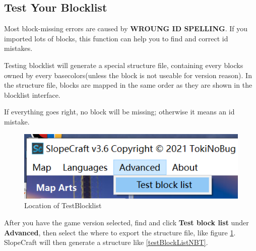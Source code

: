\documentclass{article}
\begin{document}
    \subsection{Test Your Blocklist}
    Most block-missing errors are caused by \textbf{WROUNG ID SPELLING}. If you imported lots of blocks, this function can help you to find and correct id mistakes.

    Testing blocklist will generate a special structure file, containing every blocks owned by every basecolors(unless the block is not useable for version reason). In the structure file, blocks are mapped in the same order as they are shown in the blocklist interface.
    
    If everything goes right, no block will be missing; otherwise it means an id mistake.
    
    \begin{figure}[htbp]
        \centering
        \includegraphics[width=15cm]{Img9_TestBlockList.png}
        \caption{Location of TestBlocklist}
        \label{locOfTestBlockList}
    \end{figure}

    After you have the game version selected, find and click \textbf{Test block list} under \textbf{Advanced}, then select the where to export the structure file, like figure \ref*{locOfTestBlockList}. SlopeCraft will then generate a structure like \ref*{testBlockListNBT}.
\end{document}
